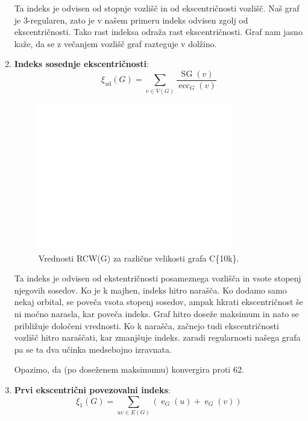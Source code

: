 \documentclass[a4paper, 12pt]{article}
\begin{document}
\begin{enumerate}
    Ta indeks je odvisen od stopnje vozlišč in od ekscentričnosti vozlišč. Naš graf je 3-regularen, zato je v našem primeru indeks odvisen zgolj od ekscentričnosti. Tako rast indeksa odraža rast ekscentričnosti. Graf nam jasno kaže, da se z večanjem vozlišč graf razteguje v dolžino.

    \item \textbf{Indeks sosednje ekscentričnosti}:
    \[
    \xi_{\text{ad}}(G) = \sum_{v \in V(G)} \frac{\operatorname{SG}(v)}{\operatorname{ecc}_G(v)}
    \]
    

    \begin{figure}[h!]
        \centering
        \includegraphics[width=0.8\textwidth]{ea_index_plot.png}
        \caption{Vrednosti RCW(G) za različne velikosti grafa C\{10k\}.}
        \label{fig:rcw}
    \end{figure}


    Ta indeks je odvisen od ekstentričnosti posameznega vozlišča in vsote stopenj njegovih sosedov. 
    Ko je k majhen, indeks hitro narašča. Ko dodamo samo nekaj orbital, se poveča vsota stopenj sosedov, ampak hkrati ekscentričnost še ni močno narasla, kar poveča indeks.
    Graf hitro doseže maksimum in nato se približuje določeni vrednosti. Ko k narašča, začnejo tudi ekscentričnosti vozlišč hitro naraščati, kar zmanjšuje indeks. zaradi regularnosti našega grafa pa se ta dva učinka medsebojno izravnata.

    Opazimo, da (po doseženem maksimumu) konvergira proti 62.


    \item \textbf{Prvi ekscentrični povezovalni indeks}:
    \[
    \xi_1(G) = \sum_{uv \in E(G)} (\operatorname{e}_G(u) + \operatorname{e}_G(v))
    \]


\end{enumerate}
\end{document}
